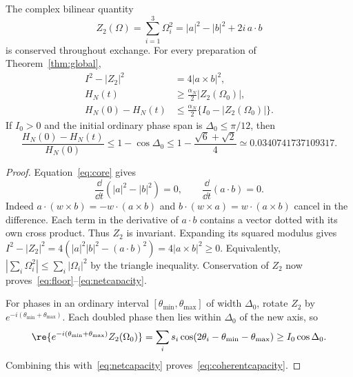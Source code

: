 \begin{theorem}\label{thm:capacity}
The complex bilinear quantity
\begin{equation}\label{eq:Z2}
 Z_2(\Omega)=\sum_{i=1}^3\Omega_i^2
           =|a|^2-|b|^2+2i\,a\cdot b
\end{equation}
is conserved throughout exchange. For every preparation of Theorem~\ref{thm:global},
\begin{align}
 I^2-|Z_2|^2&=4|a\times b|^2,\label{eq:chiralityidentity}\\
 H_N(t)&\ge\frac{\alpha_N}{2}|Z_2(\Omega_0)|,\label{eq:floor}\\
 H_N(0)-H_N(t)&\le\frac{\alpha_N}{2}\{I_0-|Z_2(\Omega_0)|\}.\label{eq:netcapacity}
\end{align}
If $I_0>0$ and the initial ordinary phase span is $\Delta_0\le\pi/12$, then
\begin{equation}\label{eq:coherentcapacity}
 \frac{H_N(0)-H_N(t)}{H_N(0)}
 \le1-\cos\Delta_0
 \le1-\frac{\sqrt6+\sqrt2}{4}\simeq0.0340741737109317.
\end{equation}
\end{theorem}
\begin{proof}
Equation~\eqref{eq:core} gives
\begin{equation}\label{eq:invariantderivatives}
 \frac{\dd}{\dd t}(|a|^2-|b|^2)=0,\qquad
 \frac{\dd}{\dd t}(a\cdot b)=0.
\end{equation}
Indeed $a\cdot(w\times b)=-w\cdot(a\times b)$ and $b\cdot(w\times a)=w\cdot(a\times b)$ cancel in the difference. Each term in the derivative of $a\cdot b$ contains a vector dotted with its own cross product. Thus $Z_2$ is invariant. Expanding its squared modulus gives
$I^2-|Z_2|^2=4(|a|^2|b|^2-(a\cdot b)^2)=4|a\times b|^2\ge0$.
Equivalently, $|\sum_i\Omega_i^2|\le\sum_i|\Omega_i|^2$ by the triangle inequality. Conservation of $Z_2$ now proves~\eqref{eq:floor}--\eqref{eq:netcapacity}.

For phases in an ordinary interval $[\theta_{\min},\theta_{\max}]$ of width $\Delta_0$, rotate $Z_2$ by $e^{-i(\theta_{\min}+\theta_{\max})}$. Each doubled phase then lies within $\Delta_0$ of the new axis, so
\begin{equation}\label{eq:phasebound}
 \re\{e^{-i(\theta_{\min}+\theta_{\max})}Z_2(\Omega_0)\}
 =\sum_i s_i\cos(2\theta_i-\theta_{\min}-\theta_{\max})
 \ge I_0\cos\Delta_0.
\end{equation}
Combining this with~\eqref{eq:netcapacity} proves~\eqref{eq:coherentcapacity}.
\end{proof}

